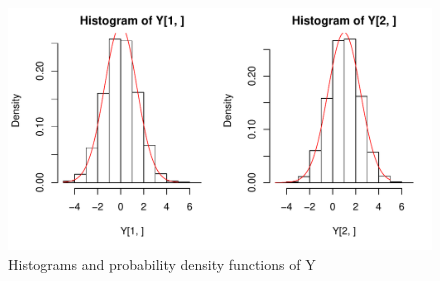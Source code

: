 \documentclass[12pt, a4paper]{article}\usepackage[]{graphicx}\usepackage[]{color}
\makeatletter
\def\maxwidth{ %
  \ifdim\Gin@nat@width>\linewidth
    \linewidth
  \else
    \Gin@nat@width
  \fi
}
\newenvironment{knitrout}{}{} %
\makeatother
\begin{document}
\begin{knitrout}
\color{fgcolor}\begin{figure}[H]

{\centering \includegraphics[width=\maxwidth]{figure/ex2checkDistrY2-1} 

}

\caption[Histograms and probability density functions of Y]{Histograms and probability density functions of Y}\label{fig:ex2checkDistrY2}
\end{figure}


\end{knitrout}
\end{document}
